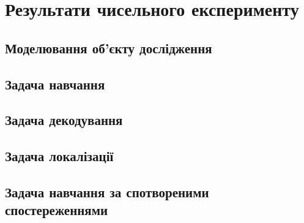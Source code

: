 \chapter{Результати чисельного експерименту}
\label{chap: practice}

\section{Моделювання об'єкту дослідження}

\section{Задача навчання}

\section{Задача декодування}

\section{Задача локалізації}

\section{Задача навчання за спотвореними спостереженнями}





